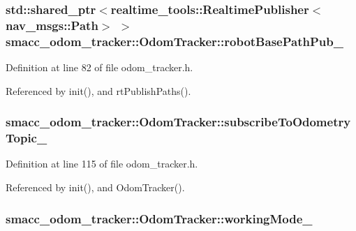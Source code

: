\subsubsection[{\texorpdfstring{robot\+Base\+Path\+Pub\+\_\+}{robotBasePathPub_}}]{\setlength{\rightskip}{0pt plus 5cm}std\+::shared\+\_\+ptr$<$realtime\+\_\+tools\+::\+Realtime\+Publisher$<$nav\+\_\+msgs\+::\+Path$>$ $>$ smacc\+\_\+odom\+\_\+tracker\+::\+Odom\+Tracker\+::robot\+Base\+Path\+Pub\+\_\+\hspace{0.3cm}{\ttfamily [protected]}}\hypertarget{classsmacc__odom__tracker_1_1OdomTracker_a32d060919f2630e0695ce016c0563a3f}{}\label{classsmacc__odom__tracker_1_1OdomTracker_a32d060919f2630e0695ce016c0563a3f}


Definition at line 82 of file odom\+\_\+tracker.\+h.



Referenced by init(), and rt\+Publish\+Paths().

\subsubsection[{\texorpdfstring{subscribe\+To\+Odometry\+Topic\+\_\+}{subscribeToOdometryTopic_}}]{ smacc\+\_\+odom\+\_\+tracker\+::\+Odom\+Tracker\+::subscribe\+To\+Odometry\+Topic\+\_\+\hspace{0.3cm}{\ttfamily [protected]}}\hypertarget{classsmacc__odom__tracker_1_1OdomTracker_a394c4040c01f687c427d34c0ab50ba3e}{}\label{classsmacc__odom__tracker_1_1OdomTracker_a394c4040c01f687c427d34c0ab50ba3e}


Definition at line 115 of file odom\+\_\+tracker.\+h.



Referenced by init(), and Odom\+Tracker().

\subsubsection[{\texorpdfstring{working\+Mode\+\_\+}{workingMode_}}]{ smacc\+\_\+odom\+\_\+tracker\+::\+Odom\+Tracker\+::working\+Mode\+\_\+\hspace{0.3cm}{\ttfamily [protected]}}\hypertarget{classsmacc__odom__tracker_1_1OdomTracker_ad011432ae35a533fd61bae43179c3c36}{}\label{classsmacc__odom__tracker_1_1OdomTracker_ad011432ae35a533fd61bae43179c3c36}


